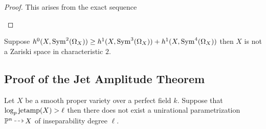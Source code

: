 \documentclass[main.tex]{subfiles}
\begin{document}
\begin{proof}
This arises from the exact sequence
\begin{center}
\end{center}
\end{proof}

\begin{example}
Suppose $h^0(X, \mathrm{Sym}^{2}\! \left( \Omega_X \right)) \ge h^1(X, \mathrm{Sym}^{3}\! \left( \Omega_X \right)) + h^1(X, \mathrm{Sym}^{4}\! \left( \Omega_X \right))$ then $X$ is not a Zariski space in characteristic $2$.
\end{example}


\subsection{Proof of the Jet Amplitude Theorem}

\begin{theorem}[C]
Let $X$ be a smooth proper variety over a perfect field $k$. Suppose that $\log_p \mathrm{jetamp}(X) > \ell$ then there does not exist a unirational parametrization $\P^n \rat X$ of inseparability degree $\ell$.
\end{theorem}
\end{document}
